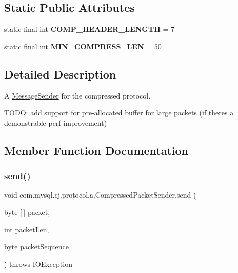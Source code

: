 \subsection*{Static Public Attributes}
\begin{DoxyCompactItemize}
\item 
\mbox{\label{classcom_1_1mysql_1_1cj_1_1protocol_1_1a_1_1_compressed_packet_sender_af23eba021b7b5002ef05f27bba7733e8}} 
static final int {\bfseries C\+O\+M\+P\+\_\+\+H\+E\+A\+D\+E\+R\+\_\+\+L\+E\+N\+G\+TH} = 7
\item 
\mbox{\label{classcom_1_1mysql_1_1cj_1_1protocol_1_1a_1_1_compressed_packet_sender_a5db21027c99a6cb911a6a286d291a326}} 
static final int {\bfseries M\+I\+N\+\_\+\+C\+O\+M\+P\+R\+E\+S\+S\+\_\+\+L\+EN} = 50
\end{DoxyCompactItemize}


\subsection{Detailed Description}
A \mbox{\hyperlink{interfacecom_1_1mysql_1_1cj_1_1protocol_1_1_message_sender}{Message\+Sender}} for the compressed protocol.

T\+O\+DO\+: add support for pre-\/allocated buffer for large packets (if there\textquotesingle{}s a demonstrable perf improvement) 

\subsection{Member Function Documentation}
\mbox{\label{classcom_1_1mysql_1_1cj_1_1protocol_1_1a_1_1_compressed_packet_sender_a643c7e9a053e2704786f8319ef8a06e7}} 
\subsubsection{\texorpdfstring{send()}{send()}}
{\footnotesize\ttfamily void com.\+mysql.\+cj.\+protocol.\+a.\+Compressed\+Packet\+Sender.\+send (\begin{DoxyParamCaption}\item[{byte \mbox{[}$\,$\mbox{]}}]{packet,  }\item[{int}]{packet\+Len,  }\item[{byte}]{packet\+Sequence }\end{DoxyParamCaption}) throws I\+O\+Exception}

